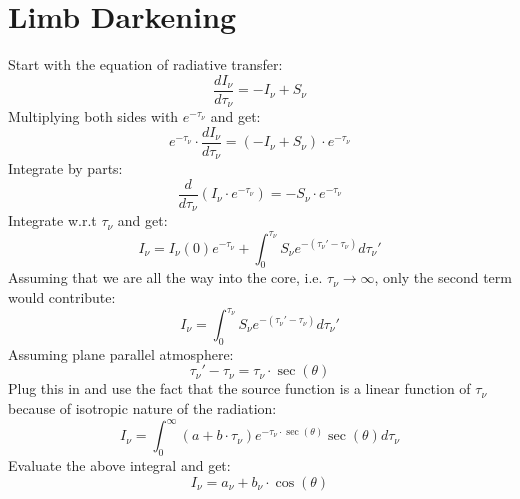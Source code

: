 \section{Limb Darkening}
Start with the equation of radiative transfer:
\begin{equation}
    \frac{d I_{\nu}}{d \tau_{\nu}}=-I_{\nu} + S_{\nu}
\end{equation}
Multiplying both sides with $e^{-\tau_{\nu}}$ and get:
\begin{equation}
   e^{-\tau_{\nu}} \cdot \frac{d I_{\nu}}{d \tau_{\nu}}=(-I_{\nu} + S_{\nu}) \cdot e^{-\tau_{\nu}}
\end{equation}
Integrate by parts:
\begin{equation}
   \frac{d}{d\tau_{\nu} } (I_{\nu} \cdot e^{-\tau_{\nu}})= -S_{\nu} \cdot  e^{-\tau_{\nu}}
\end{equation}
Integrate w.r.t $\tau_{\nu}$ and get:
\begin{equation}
   I_{\nu}=I_{\nu}(0)e^{-\tau_{\nu}}+\int_{0}^{\tau_{\nu}} S_{\nu} e^{-(\tau_{\nu}\prime-\tau_{\nu})} d\tau_{\nu}\prime
\end{equation}
Assuming that we are all the way into the core, i.e. $\tau_{\nu} \rightarrow \infty$, only the second term would contribute:
\begin{equation}
   I_{\nu}=\int_{0}^{\tau_{\nu}} S_{\nu} e^{-(\tau_{\nu}\prime-\tau_{\nu})} d\tau_{\nu}\prime
\end{equation}
Assuming plane parallel atmosphere:
\begin{equation}
\tau_{\nu}\prime-\tau_{\nu} = \tau_{\nu} \cdot \sec(\theta)
\end{equation}
Plug this in and use the fact that the source function is a linear function of $\tau_{\nu}$ because of isotropic nature of the radiation:
\begin{equation}
   I_{\nu}=\int_{0}^{\infty} (a+b\cdot\tau_{\nu} ) e^{-\tau_{\nu} \cdot \sec(\theta)} \sec(\theta) d\tau_{\nu}
\end{equation}
Evaluate the above integral and get:
\begin{equation}
   I_{\nu}=a_{\nu} + b_{\nu} \cdot \cos(\theta)
   \label{eq:1}
\end{equation}

